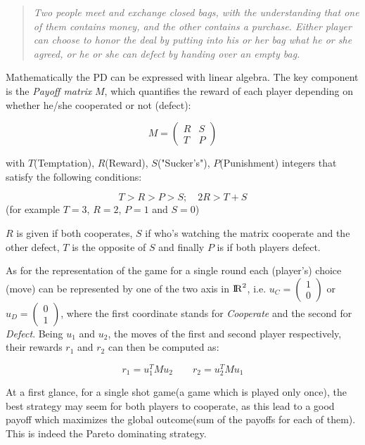 \documentclass[journal,a4paper,10pt,twoside]{IEEEtran}
\begin{document}
\begin{quote}
\textit{Two people meet and exchange closed bags, with the understanding that one of them contains money, and the other contains a purchase. Either player can choose to honor the deal by putting into his or her bag what he or she agreed, or he or she can defect by handing over an empty bag.}
\end{quote}

Mathematically the PD can be expressed with linear algebra. The key component is the \textit{Payoff matrix} $M$, which quantifies the reward of each player depending on whether he/she cooperated or not (defect):

$$
M = 
\begin{pmatrix} 
R & S \\
T & P 
\end{pmatrix}
$$

with $T$(Temptation), $R$(Reward), $S$("Sucker's"), $P$(Punishment) integers that satisfy the following conditions:

$$
T>R>P>S; \quad 2R > T+S 
$$  (for example $T=3$, $R=2$, $P=1$ and $S=0$)

$R$ is given if both cooperates, $S$ if who's watching the matrix cooperate and the other defect, $T$ is the opposite of $S$ and finally $P$ is if both players defect.

As for the representation of the game for a single round each (player's) choice (move) can be represented by one of the two axis in ${\rm I\!R}^2$, i.e. $u_C=\begin{pmatrix} 1 \\ 0 \end{pmatrix}$ or $u_D=\begin{pmatrix} 0 \\ 1 \end{pmatrix}$, where the first coordinate stands for \textit{Cooperate} and the second for \textit{Defect}. Being $u_1$ and $u_2$, the moves of the first and second player respectively, their rewards $r_1$ and $r_2$ can then be computed as:

$$
r_1 = u_1^T M u_2
\quad
\quad
r_2 = u_2^T M u_1
$$


At a first glance, for a single shot game(a game which is played only once), the best strategy may seem for both players to cooperate, as this lead to a good payoff which maximizes the global outcome(sum of the payoffs for each of them). This is indeed the Pareto dominating strategy. 
\end{document}
